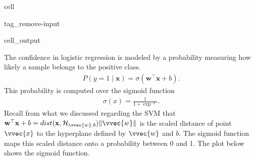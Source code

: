 \documentclass[letterpaper,10pt,english]{jupyterBook}
\begin{document}
\begin{sphinxuseclass}{cell}
\begin{sphinxuseclass}{tag_remove-input}\begin{sphinxVerbatimOutput}

\begin{sphinxuseclass}{cell_output}
\noindent{}

\end{sphinxuseclass}\end{sphinxVerbatimOutput}

\end{sphinxuseclass}
\end{sphinxuseclass}
\sphinxAtStartPar
The confidence in logistic regression is modeled by a probability measuring how likely a sample belongs to the positive class.
\begin{equation*}
\begin{split}
P(y=1 \mid \mathbf{x}) = \sigma(\mathbf{w}^\top \mathbf{x} + b).
\end{split}
\end{equation*}
\sphinxAtStartPar
This probability is computed over the sigmoid function
\begin{equation*}
\begin{split}\sigma(x) = \frac{1}{1 + \exp^{-x}}.\end{split}
\end{equation*}
Recall from what we discussed regarding the SVM that \(\mathbf{w}^\top \mathbf{x} + b = dist(\mathbf{x},\mathcal{H}_{\vvec{w},b})\lVert\vvec{w}\rVert\) is the scaled distance of point \(\vvec{x}\) to the hyperplane defined by \(\vvec{w}\) and \(b\). The sigmoid function maps this scaled distance onto a probability between 0 and 1.
The plot below shows the sigmoid function.
\end{document}
